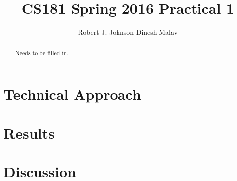 \documentclass{article}
\begin{document}
\title{CS181 Spring 2016 Practical 1}
\author{Robert J. Johnson Dinesh Malav}


\maketitle

\begin{abstract}
Needs to be filled in. 
\end{abstract}

\section{Technical Approach}


\section{Results}

\section{Discussion}
\end{document}
